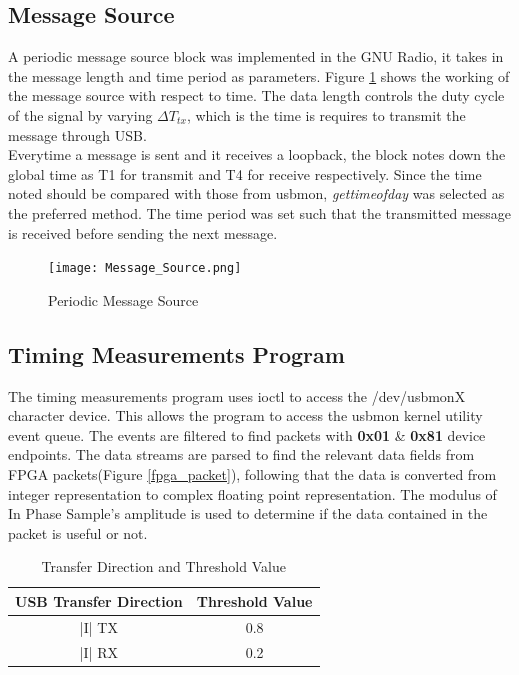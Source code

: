 \documentclass{kththesis}
\begin{document}
\subsection{Message Source} \label{message_source}
A periodic message source block was implemented in the GNU Radio, it takes in the message length and time period as parameters. Figure \ref{message_source} shows the working of the message source with respect to time. The data length controls the duty cycle of the signal by varying $\Delta T_{tx}$, which is the time is requires to transmit the message through USB.\\

Everytime a message is sent and it receives a loopback, the block notes down the global time as T1 for transmit and T4 for receive respectively. Since the time noted should be compared with those from usbmon, \textit{gettimeofday} was selected as the preferred method. The time period was set such that the transmitted message is received before sending the next message.\\

\begin{figure}[h!]
\centering
\texttt{[image: Message\_Source.png]}
\caption{Periodic Message Source}
\label{message_source}
\end{figure}
\subsection{Timing Measurements Program}
The timing measurements program uses ioctl to access the /dev/usbmonX character device. This allows the program to access the usbmon kernel utility event queue. The events are filtered to find packets with \textbf{0x01} \& \textbf{0x81} device endpoints. The data streams are parsed to find the relevant data fields from FPGA packets(Figure \ref{fpga_packet}), following that the data is converted from integer representation to complex floating point representation. The modulus of In Phase Sample's amplitude is used to determine if the data contained in the packet is useful or not. 

\begin{table}
\centering
\begin{tabular}{|c|c|}
\hline
USB Transfer Direction & Threshold Value  \\
\hline
|I| TX & 0.8\\
|I| RX & 0.2\\
\hline
\end{tabular}
\caption{Transfer Direction and Threshold Value}
\label{thres_table}
\end{table}
\end{document}
